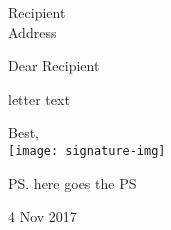 \documentclass[letterpaper]{letter}
\date{}
\begin{document}
\begin{letter}{Recipient \\ Address}
\opening{Dear Recipient}
letter text

\closing{Best, \\
    \texttt{[image: signature-img]}}

\ps
    \vspace{10pt}
here goes the PS

    \hspace{100pt}4 Nov 2017

\end{letter}
\end{document}
